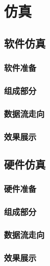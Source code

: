 \chapter{仿真}
    \section{软件仿真}
        \subsection{软件准备}
        \subsection{组成部分}
        \subsection{数据流走向}
        \subsection{效果展示}
    \section{硬件仿真}
        \subsection{硬件准备}
        \subsection{组成部分}
        \subsection{数据流走向}
        \subsection{效果展示}